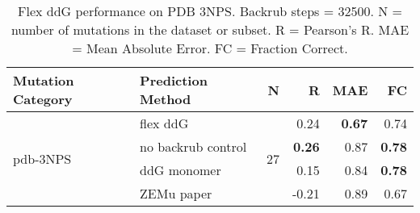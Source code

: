 \begin{table}
  \begin{tabular}{llrrrr}
\toprule
Mutation Category &   Prediction Method &   N &     R &  MAE &   FC \\
\midrule
 \multirow{ 4}{*}{pdb-3NPS} & flex ddG & \multirow{ 4}{*}{27} & 0.24 & \textbf{0.67} & 0.74  \\
 & no backrub control & & \textbf{0.26} & 0.87 & \textbf{0.78}  \\
 & ddG monomer & & 0.15 & 0.84 & \textbf{0.78}  \\
 & ZEMu paper & & -0.21 & 0.89 & 0.67  \\
\bottomrule
\end{tabular}
  \caption[Flex ddG performance on PDB 3NPS]{
    Flex ddG performance on PDB 3NPS. Backrub steps = 32500. N = number of mutations in the dataset or subset. R = Pearson's R. MAE = Mean Absolute Error. FC = Fraction Correct.
  } \label{tab:table-pdb-3NPS}
\end{table}
